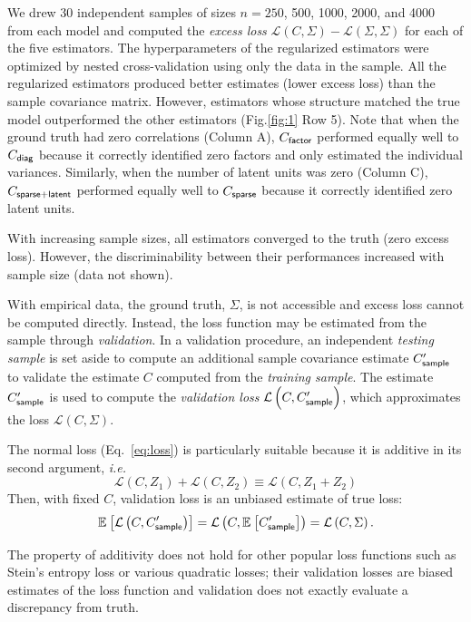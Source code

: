 \documentclass[10pt]{article}
\newcommand{\figref}[2]{Fig.\;\ref{fig:#1}\,#2}
\newcommand{\loss}[1]{\mathcal L\left(#1\right)}
\newcommand{\E}[2][]{\mathbb E_{#1}\left[ #2\right]}    %
\newcommand{\ie}{\emph{i.e.}\;}
\begin{document}
We drew 30 independent samples of sizes $n=250$, 500, 1000, 2000, and 4000 from each model and computed the \emph{excess loss} $\loss{C,\Sigma}-\loss{\Sigma,\Sigma}$ for each of the five estimators.  The hyperparameters of the regularized estimators were optimized by nested cross-validation using only the data in the sample.  All the regularized estimators produced better estimates (lower excess loss) than the sample covariance matrix.  However, estimators whose structure matched the true model outperformed the other estimators (\figref{1}{\,Row 5}).  Note that when the ground truth had zero correlations (Column A), $C_{\sf factor}$ performed equally well to $C_{\sf diag}$ because it correctly identified zero factors and only estimated the individual variances. Similarly, when the number of latent units was zero (Column C), $C_{\sf sparse+latent}$ performed equally well to $C_{\sf sparse}$ because it correctly identified zero latent units. 

With increasing sample sizes, all estimators converged to the truth (zero excess loss).  However, 
the discriminability between their performances increased with sample size (data not shown).

With empirical data, the ground truth, $\Sigma$, is not accessible and excess loss cannot be computed directly. Instead, the loss function may be estimated from the sample through \emph{validation}.  In a validation procedure, an independent \emph{testing sample} is set aside to compute an additional sample covariance estimate $C_{\sf sample}^\prime$ to validate the estimate $C$ computed from the  \emph{training sample}.   The estimate $C_{\sf sample}^\prime$ is used to compute the \emph{validation loss} $\loss{C,C_{\sf sample}^\prime}$, which approximates the loss  $\loss{C,\Sigma}$.

The normal loss (Eq.~\ref{eq:loss}) is particularly suitable because it is additive in its second argument, \ie
\begin{equation*}\label{eq:additivity}
    \loss{C,Z_1} + \loss{C,Z_2} \equiv \loss{C,Z_1+Z_2}
\end{equation*}
Then, with fixed $C$, validation loss is an unbiased estimate of true loss:
\begin{equation*}
    \E{\loss{C,C_{\sf sample}^\prime}}=\loss{C,\E{C_{\sf sample}^\prime}}=\loss{C,\Sigma}.
\end{equation*}

The property of additivity does not hold for other popular loss functions such as Stein's entropy loss or various quadratic losses; their validation losses are biased estimates of the loss function and validation does not exactly evaluate a discrepancy from truth. 
\end{document}

